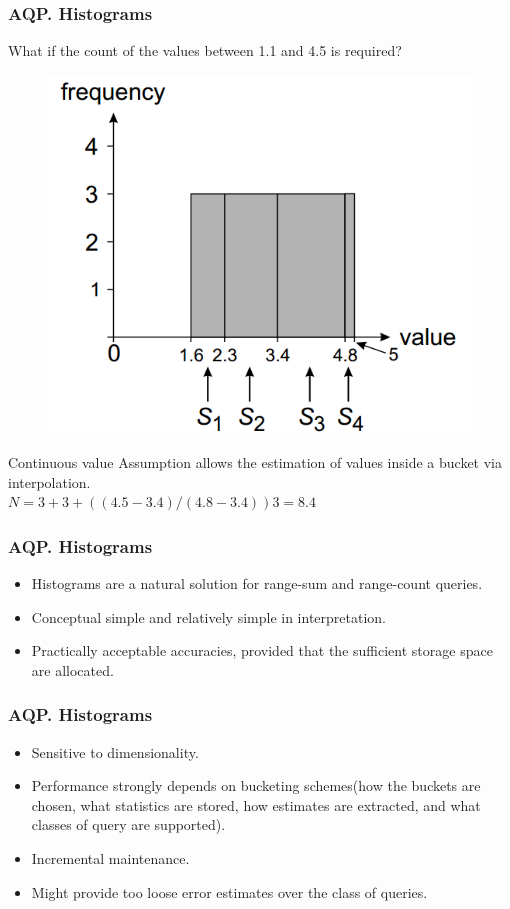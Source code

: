 \documentclass{beamer}
\begin{document}
\begin{frame}
\frametitle{AQP. Histograms}
What if the count of the values between 1.1 and 4.5 is required?\\
\begin{figure}
  \centering
  \includegraphics[scale=0.30]{img/Blinktopus-EquiDepth.png}
\end{figure}
Continuous value Assumption allows the estimation of values inside a bucket via interpolation. \\
\vspace{0.3 cm}
$ N = 3 + 3 + ((4.5 − 3.4)/(4.8 − 3.4))3 = 8.4$
\end{frame}

\begin{frame}
\frametitle{AQP. Histograms}
	\begin{itemize}
		\item Histograms are a natural solution for range-sum and range-count queries.
		\item Conceptual simple and relatively simple in interpretation.
		\item Practically acceptable accuracies, provided that the sufficient storage space are allocated.
	\end{itemize}
\end{frame}

\begin{frame}
\frametitle{AQP. Histograms}
	\begin{itemize}
		\item Sensitive to dimensionality.
		\item Performance strongly depends on bucketing schemes(how the buckets are chosen, what statistics are stored, how estimates are extracted, and what classes of query are supported).
		\item Incremental maintenance.
		\item Might provide too loose error estimates over the class of queries.
	\end{itemize}
\end{frame}
\end{document}

